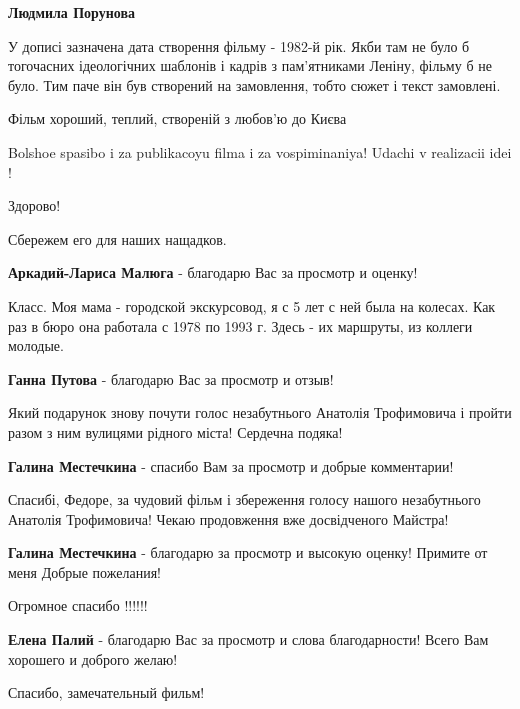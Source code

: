\begin{itemize}
\begin{itemize} %
\textbf{Людмила Порунова} 

У дописі зазначена дата створення фільму - 1982-й рік. Якби там не було б
тогочасних ідеологічних шаблонів і кадрів з пам'ятниками Леніну, фільму б не
було. Тим паче він був створений на замовлення, тобто сюжет і текст замовлені.

Фільм хороший, теплий, створеній з любов'ю до Києва

\end{itemize} %


Bolshoe spasibo i za publikacoyu filma i za vospiminaniya! Udachi v realizacii idei !

Здорово!

Сбережем его для наших нащадков.

\textbf{Аркадий-Лариса Малюга} - благодарю Вас за просмотр и оценку!


Класс. Моя мама - городской экскурсовод, я с 5 лет с ней была на колесах. Как
раз в бюро она работала с 1978 по 1993 г. Здесь - их маршруты, из коллеги
молодые.

\textbf{Ганна Путова} - благодарю Вас за просмотр и отзыв!


Який подарунок знову почути голос незабутнього Анатолія Трофимовича і пройти
разом з ним вулицями рідного міста! Сердечна подяка!

\textbf{Галина Местечкина} - спасибо Вам за просмотр и добрые комментарии!


Спасибі, Федоре, за чудовий фільм і збереження голосу нашого незабутнього
Анатолія Трофимовича! Чекаю продовження вже досвідченого Майстра!

\textbf{Галина Местечкина} - благодарю за просмотр и высокую оценку! Примите от меня Добрые пожелания!

Огромное спасибо !!!!!!

\textbf{Елена Палий} - благодарю Вас за просмотр и слова благодарности! Всего Вам хорошего и доброго желаю!

Спасибо, замечательный фильм!


\end{itemize}
